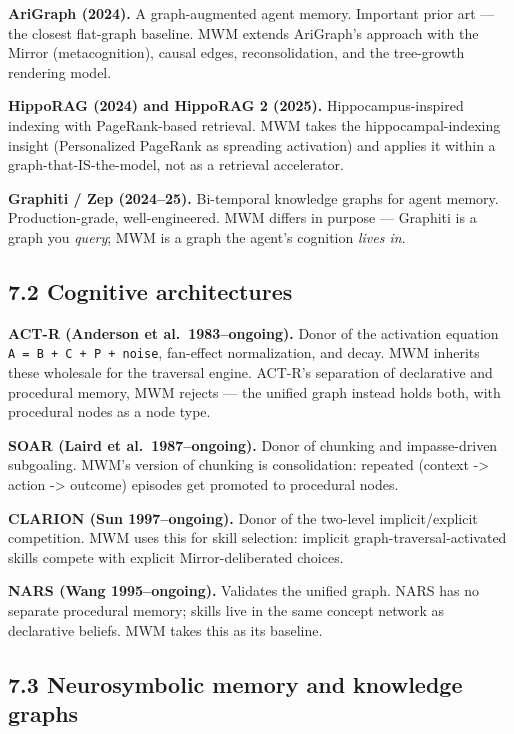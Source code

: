 \documentclass[12pt]{article}
\begin{document}
\textbf{AriGraph (2024).} A graph-augmented agent memory. Important prior art --- the closest flat-graph baseline. MWM extends AriGraph's approach with the Mirror (metacognition), causal edges, reconsolidation, and the tree-growth rendering model.

\textbf{HippoRAG (2024) and HippoRAG 2 (2025).} Hippocampus-inspired indexing with PageRank-based retrieval. MWM takes the hippocampal-indexing insight (Personalized PageRank as spreading activation) and applies it within a graph-that-IS-the-model, not as a retrieval accelerator.

\textbf{Graphiti / Zep (2024--25).} Bi-temporal knowledge graphs for agent memory. Production-grade, well-engineered. MWM differs in purpose --- Graphiti is a graph you \emph{query}; MWM is a graph the agent's cognition \emph{lives in}.

\subsection{7.2 Cognitive architectures}\label{cognitive-architectures}

\textbf{ACT-R (Anderson et al.~1983--ongoing).} Donor of the activation equation \texttt{A\ =\ B\ +\ C\ +\ P\ +\ noise}, fan-effect normalization, and decay. MWM inherits these wholesale for the traversal engine. ACT-R's separation of declarative and procedural memory, MWM rejects --- the unified graph instead holds both, with procedural nodes as a node type.

\textbf{SOAR (Laird et al.~1987--ongoing).} Donor of chunking and impasse-driven subgoaling. MWM's version of chunking is consolidation: repeated (context -\textgreater{} action -\textgreater{} outcome) episodes get promoted to procedural nodes.

\textbf{CLARION (Sun 1997--ongoing).} Donor of the two-level implicit/explicit competition. MWM uses this for skill selection: implicit graph-traversal-activated skills compete with explicit Mirror-deliberated choices.

\textbf{NARS (Wang 1995--ongoing).} Validates the unified graph. NARS has no separate procedural memory; skills live in the same concept network as declarative beliefs. MWM takes this as its baseline.

\subsection{7.3 Neurosymbolic memory and knowledge graphs}\label{neurosymbolic-memory-and-knowledge-graphs}
\end{document}
